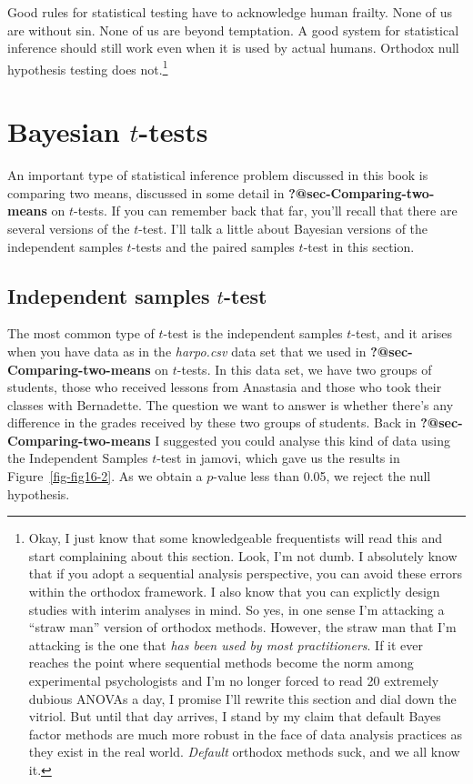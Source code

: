 \documentclass[
  a4paper,
]{book}
\begin{document}
Good rules for statistical testing have to acknowledge human frailty.
None of us are without sin. None of us are beyond temptation. A good
system for statistical inference should still work even when it is used
by actual humans. Orthodox null hypothesis testing does not.\footnote{Okay,
  I just know that some knowledgeable frequentists will read this and
  start complaining about this section. Look, I'm not dumb. I absolutely
  know that if you adopt a sequential analysis perspective, you can
  avoid these errors within the orthodox framework. I also know that you
  can explictly design studies with interim analyses in mind. So yes, in
  one sense I'm attacking a ``straw man'' version of orthodox methods.
  However, the straw man that I'm attacking is the one that \emph{has
  been used by most practitioners}. If it ever reaches the point where
  sequential methods become the norm among experimental psychologists
  and I'm no longer forced to read 20 extremely dubious ANOVAs a day, I
  promise I'll rewrite this section and dial down the vitriol. But until
  that day arrives, I stand by my claim that default Bayes factor
  methods are much more robust in the face of data analysis practices as
  they exist in the real world. \emph{Default} orthodox methods suck,
  and we all know it.}

\hypertarget{bayesian-t-tests}{%
\section{\texorpdfstring{Bayesian
\(t\)-tests}{Bayesian t-tests}}\label{bayesian-t-tests}}

An important type of statistical inference problem discussed in this
book is comparing two means, discussed in some detail in
\textbf{?@sec-Comparing-two-means} on \(t\)-tests. If you can remember
back that far, you'll recall that there are several versions of the
\(t\)-test. I'll talk a little about Bayesian versions of the
independent samples \(t\)-tests and the paired samples \(t\)-test in
this section.

\hypertarget{independent-samples-t-test}{%
\subsection{\texorpdfstring{Independent samples
\(t\)-test}{Independent samples t-test}}\label{independent-samples-t-test}}

The most common type of \(t\)-test is the independent samples
\(t\)-test, and it arises when you have data as in the \emph{harpo.csv}
data set that we used in \textbf{?@sec-Comparing-two-means} on
\(t\)-tests. In this data set, we have two groups of students, those who
received lessons from Anastasia and those who took their classes with
Bernadette. The question we want to answer is whether there's any
difference in the grades received by these two groups of students. Back
in \textbf{?@sec-Comparing-two-means} I suggested you could analyse this
kind of data using the Independent Samples \(t\)-test in jamovi, which
gave us the results in Figure~\ref{fig-fig16-2}. As we obtain a
\(p\)-value less than 0.05, we reject the null hypothesis.
\end{document}
